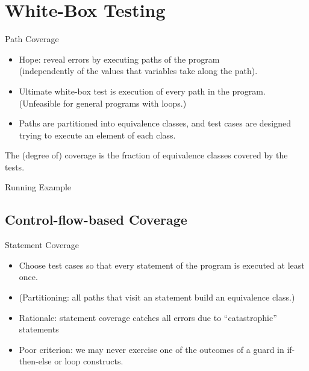 \section{White-Box Testing}

\begin{Frame}{Path Coverage}
  \begin{itemize}
    \item Hope: reveal errors by executing paths of the program\\
    (independently of the values that variables take along the path).
    \item Ultimate white-box test is execution of every path in the program.\\
    (Unfeasible for general programs with loops.)
    \item Paths are partitioned into \alert{equivalence classes}, and test cases are designed trying to execute an element of each class.
  \end{itemize}

  \xxx

  \begin{definition}[Coverage]
    The \alert{(degree of) coverage} is the fraction of equivalence classes covered by the tests.
  \end{definition}
\end{Frame}



\begin{Frame}{Running Example}
  \begin{center}
  \end{center}
\end{Frame}

\subsection{Control-flow-based Coverage}

\begin{Frame}{Statement Coverage}
  \begin{itemize}
    \item Choose test cases so that every \alert{statement} of the program is executed at least once.
    \item (Partitioning: all paths that visit an statement build an equivalence class.)
    \item Rationale: statement coverage catches all errors due to \enquote{catastrophic} statements
    \item \alert{Poor criterion}: we may never exercise one of the outcomes of a guard in if-then-else or loop constructs.
  \end{itemize}
\end{Frame}

